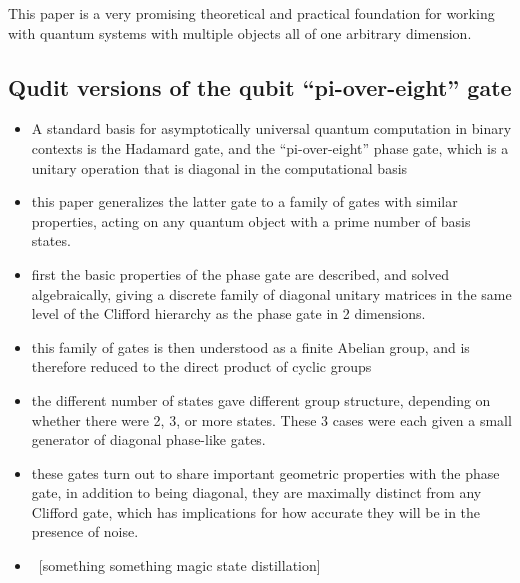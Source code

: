 This paper is a very promising theoretical and practical foundation for working with quantum systems with multiple objects all of one arbitrary dimension.

\subsection{Qudit versions of the qubit ``pi-over-eight'' gate}
\begin{itemize}
	\item A standard basis for asymptotically universal quantum computation in binary contexts is the Hadamard gate, and the ``pi-over-eight'' phase gate, which is a unitary operation that is diagonal in the computational basis
	\item this paper generalizes the latter gate to a family of gates with similar properties, acting on any quantum object with a prime number of basis states.
	\item first the basic properties of the phase gate are described, and solved algebraically, giving a discrete family of diagonal unitary matrices in the same level of the Clifford hierarchy as the phase gate in 2 dimensions.
	\item this family of gates is then understood as a finite Abelian group, and is therefore reduced to the direct product of cyclic groups
	\item the different number of states gave different group structure, depending on whether there were 2, 3, or more states. These 3 cases were each given a small generator of diagonal phase-like gates.
	\item these gates turn out to share important geometric properties with the phase gate, in addition to being diagonal, they are maximally distinct from any Clifford gate, which has implications for how accurate they will be in the presence of noise.
	\item \ [something something magic state distillation]
\end{itemize}

